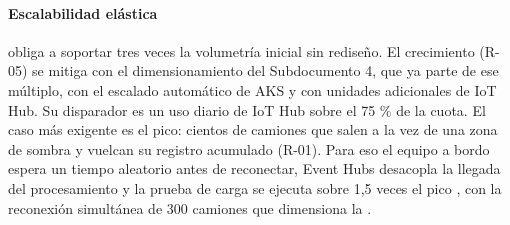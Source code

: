\paragraph{Escalabilidad elástica}
 obliga a soportar tres veces la volumetría inicial sin rediseño. El crecimiento
(R-05) se mitiga con el dimensionamiento del Subdocumento 4, que ya parte de ese múltiplo, con el escalado
automático de AKS y con unidades adicionales de IoT Hub. Su disparador es un uso diario de IoT Hub sobre
el 75 \% de la cuota. El caso más exigente es el pico: cientos de camiones
que salen a la vez de una zona de sombra y vuelcan su registro acumulado (R-01). Para eso el equipo a
bordo espera un tiempo aleatorio antes de reconectar, Event Hubs desacopla la llegada del procesamiento y
la prueba de carga se ejecuta sobre 1,5 veces el pico , con la reconexión
simultánea de 300 camiones que dimensiona la .

